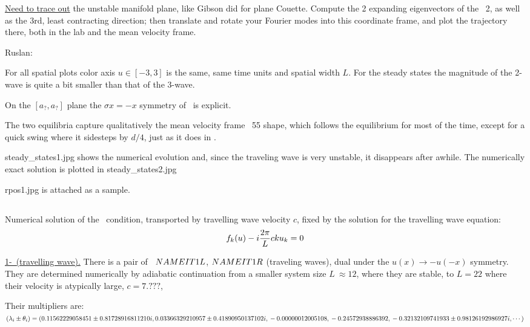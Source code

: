 \underline{Need to trace out}
the unstable manifold plane, like Gibson did for plane Couette.
Compute the 2 expanding eigenvectors of the
\eqv\ {\nameit}2, as well as the 3rd, least contracting direction; then
translate and rotate your Fourier modes into this coordinate frame,
and plot the trajectory there, both in the lab and the mean velocity frame.

Ruslan: %
% 

For all spatial plots color axis $u \in [-3, 3]$ is the same,
same time units and spatial width $L$.
For the steady states the magnitude of the 2-wave is quite 
a bit smaller than that of the 3-wave.

On the 
	$[a_?,a_?]$ plane
	the $\sigma x = -x$ symmetry of \KSe\ is explicit.

The two equilibria
capture qualitatively the mean velocity frame \rpo\ {\nameit}55 shape,
which follows the
equilibrium for most of the time, except for a quick swing where it
sidesteps by $d/4$, just as it does in . 


steady\_states1.jpg shows the numerical evolution and, since the
traveling wave is very unstable, it disappears after awhile. 
The numerically exact solution is plotted in steady\_states2.jpg

rpos1.jpg is attached as a sample. 

\subsection{\Reqva}

Numerical solution of the \reqv\  condition,
transported by travelling wave velocity $c$, 
fixed by the solution for the travelling wave equation:
\[
f_k(u) - i{2\pi\over L} c k u_k = 0
\]

\underline{1-\reqv\  (travelling wave).}
There is a pair of \reqva\ 
${NAMEIT}1L$,
${NAMEIT}1R$
(traveling waves), dual under the
$u(x) \to -u(-x)$ symmetry. They are 
determined numerically by 
adiabatic continuation from a smaller system size
$L~\approx 12$,
where they are stable, to $L=22$
where their velocity is atypically large, $c=7.???$,

Their multipliers are:
$(\lambda_i \pm \theta_i)=
(
  0.11562229058451 \pm 0.81728916811210i,	\\
  0.03366329210957 \pm 0.41890950137102i,	\\
 -0.00000012005108                    ,	\\
 -0.24572938886392                    ,	\\
 -0.32132109741933 \pm 0.98126192986927i,
\cdots
)$

